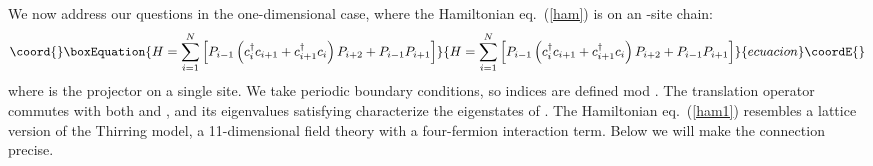 \documentclass[a4paper,prl,aps,twocolumn]{revtex4}
\begin{document}
We now address our questions in the one-dimensional case,
where the Hamiltonian eq.~(\ref{ham}) is on an \coordHE{}-site chain: 
\begin{equation}\coord{}\boxEquation{  
H= \sum_{i=1}^N \left[P_{i-1}  
\left( c^\dagger_i c_{i+1} + c^\dagger_{i+1}c_i\right)P_{i+2}  
 +P_{i-1}P_{i+1}\right]  
\label{ham1}  
}{  
H= \sum_{i=1}^N \left[P_{i-1}  
\left( c^\dagger_i c_{i+1} + c^\dagger_{i+1}c_i\right)P_{i+2}  
 +P_{i-1}P_{i+1}\right]  
}{ecuacion}\coordE{}\end{equation}  
where \coordHE{} is the projector on a single site.  
We take periodic boundary conditions, so indices are defined 
mod \coordHE{}. The translation operator \coordHE{} commutes with
both \coordHE{} and \coordHE{}, and its
eigenvalues \coordHE{} satisfying \coordHE{} 
characterize the eigenstates of \coordHE{}. The Hamiltonian eq.~(\ref{ham1})
resembles a lattice version of the Thirring model,  
a 1\myHighlight{$+$}\coordHE{}1-dimensional field theory with a four-fermion interaction term.   
Below we will make the connection precise.
  
\end{document}
